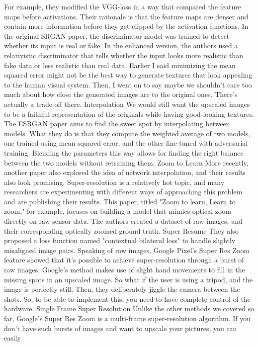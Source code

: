 For example, they modified the VGG-loss in a way that compared the feature maps before
activations.
Their rationale is that the feature maps are denser and contain more information before
they get clipped by the activation functions.
In the original SRGAN paper, the discriminator model was trained to detect whether its input
is real or fake.
In the enhanced version, the authors used a relativistic discriminator that tells whether
the input looks more realistic than fake data or less realistic than real data.
Earlier I said minimizing the mean squared error might not be the best way to generate
textures that look appealing to the human visual system.
Then, I went on to say maybe we shouldn't care too much about how close the generated
images are to the original ones.
There's actually a trade-off there.
Interpolation
We would still want the upscaled images to be a faithful representation of the originals
while having good-looking textures.
The ESRGAN paper aims to find the sweet spot by interpolating between models.
What they do is that they compute the weighted average of two models, one trained using mean
squared error, and the other fine-tuned with adversarial training.
Blending the parameters this way allows for finding the right balance between the two
models without retraining them.
Zoom to Learn
More recently, another paper also explored the idea of network interpolation, and their
results also look promising.
Super-resolution is a relatively hot topic, and many researchers are experimenting with
different ways of approaching this problem and are publishing their results.
This paper, titled "Zoom to learn, Learn to zoom," for example, focuses on building a
model that mimics optical zoom directly on raw sensor data.
The authors created a dataset of raw images, and their corresponding optically zoomed ground
truth.
Super Resume
They also proposed a loss function named "contextual bilateral loss" to handle slightly misaligned
image pairs.
Speaking of raw images, Google Pixel's Super Res Zoom feature showed that it's possible
to achieve super-resolution through a burst of raw images.
Google's method makes use of slight hand movements to fill in the missing spots in an upscaled
image.
So what if the user is using a tripod, and the image is perfectly still.
Then, they deliberately jiggle the camera between the shots.
So, to be able to implement this, you need to have complete control of the hardware.
Single Frame Super Resolution
Unlike the other methods we covered so far, Google's Super Res Zoom is a multi-frame super-resolution
algorithm.
If you don't have such bursts of images and want to upscale your pictures, you can easily

